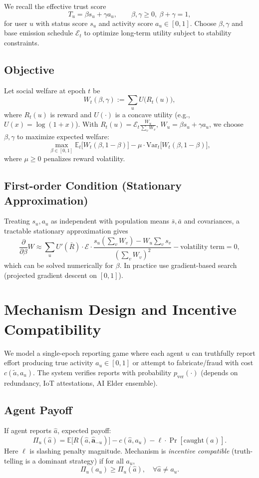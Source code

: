 \documentclass[11pt,a4paper]{article}
\begin{document}
We recall the effective trust score
\[
T_u = \beta s_u + \gamma a_u,\qquad \beta,\gamma\ge0,\ \beta+\gamma=1,
\]
for user \(u\) with status score \(s_u\) and activity score \(a_u\in[0,1]\).
Choose \(\beta,\gamma\) and base emission schedule \(\mathcal{E}_t\) to optimize long-term utility subject to stability constraints.

\subsection{Objective}
Let social welfare at epoch \(t\) be
\[
W_t(\beta,\gamma) := \sum_u U\big(R_t(u)\big),
\]
where \(R_t(u)\) is reward and \(U(\cdot)\) is a concave utility (e.g., \(U(x)=\log(1+x)\)). With \(R_t(u)=\mathcal{E}_t\frac{W_u}{\sum_v W_v}\), \(W_u=\beta s_u+\gamma a_u\), we choose \(\beta,\gamma\) to maximize expected welfare:
\[
\max_{\beta\in[0,1]} \mathbb{E}_t\big[W_t(\beta,1-\beta)\big] - \mu\cdot \mathrm{Var}_t\big[W_t(\beta,1-\beta)\big],
\]
where \(\mu\ge0\) penalizes reward volatility.

\subsection{First-order Condition (Stationary Approximation)}
Treating $s_u,a_u$ as independent with population means \(\bar s,\bar a\) and covariances, a tractable stationary approximation gives
\[
\frac{\partial}{\partial\beta} W \approx \sum_u U'\!(\bar R)\cdot \mathcal{E}\cdot\frac{s_u(\sum_v W_v)-W_u\sum_v s_v}{(\sum_v W_v)^2} - \text{volatility term}=0,
\]
which can be solved numerically for \(\beta\). In practice use gradient-based search (projected gradient descent on \([0,1]\)).

\section{Mechanism Design and Incentive Compatibility}

We model a single-epoch reporting game where each agent \(u\) can truthfully report effort producing true activity \(a_u\in[0,1]\) or attempt to fabricate/fraud with cost \(c(\tilde a,a_u)\). The system verifies reports with probability \(p_{\text{ver}}(\cdot)\) (depends on redundancy, IoT attestations, AI Elder ensemble).

\subsection{Agent Payoff}
If agent reports \(\hat a\), expected payoff:
\[
\Pi_u(\hat a) = \mathbb{E}\big[R(\hat a,\mathbf{\hat a}_{-u})\big] - c(\hat a,a_u) - \ell\cdot \Pr[\text{caught}(\hat a)].
\]
Here \(\ell\) is slashing penalty magnitude. Mechanism is \emph{incentive compatible} (truth-telling is a dominant strategy) if for all \(a_u\),
\[
\Pi_u(a_u) \ge \Pi_u(\hat a),\quad \forall \hat a\ne a_u.
\]
\end{document}
